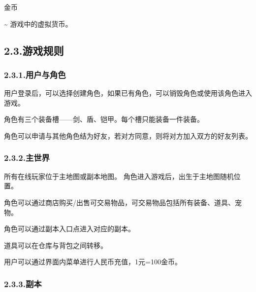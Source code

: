 \documentclass{article}
\begin{document}
 金币%

  \textasciitilde{} 游戏中的虚拟货币。%

\subsection{2.3.\hspace*{0.5em}游戏规则}\label{23}%

\subsubsection{2.3.1.\hspace*{0.5em}用户与角色}\label{231}%

\noindent{}用户登录后，可以选择创建角色，如果已有角色，可以销毁角色或使用该角色进入游戏。%

角色有三个装备槽——剑、盾、铠甲。每个槽只能装备一件装备。%

角色可以申请与其他角色结为好友，若对方同意，则将对方加入双方的好友列表。%

\subsubsection{2.3.2.\hspace*{0.5em}主世界}\label{232}%

\noindent{}所有在线玩家位于主地图或副本地图。 角色进入游戏后，出生于主地图随机位置。%

角色可以通过商店购买/出售可交易物品，可交易物品包括所有装备、道具、宠物。%

角色可以通过副本入口点进入对应的副本。%

道具可以在仓库与背包之间转移。%

用户可以通过界面内菜单进行人民币充值，1元=100金币。%

\subsubsection{2.3.3.\hspace*{0.5em}副本}\label{233}%
\end{document}
